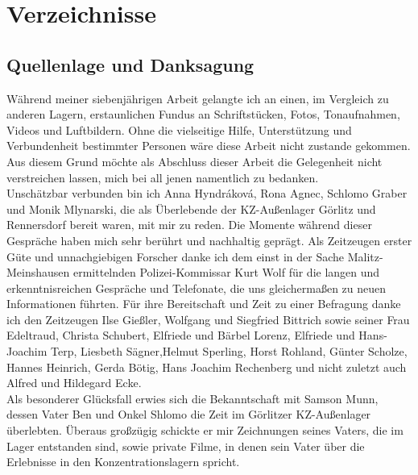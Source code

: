 \documentclass[a4paper,12pt,ngerman,
]{nisebook}
\begin{document}
\chapter{Verzeichnisse}


%
\section*{Quellenlage und Danksagung}
Während meiner siebenjährigen Arbeit gelangte ich an einen, im Vergleich zu anderen Lagern, erstaunlichen Fundus an Schriftstücken, Fotos, Tonaufnahmen, Videos und Luftbildern. Ohne die vielseitige Hilfe, Unterstützung und Verbundenheit bestimmter Personen wäre diese Arbeit nicht zustande gekommen. Aus diesem Grund möchte als Abschluss dieser Arbeit die Gelegenheit nicht verstreichen lassen, mich bei all jenen namentlich zu bedanken.
\\
Unschätzbar verbunden bin ich Anna Hyndr\'akov\'a, Rona Agnec, Schlomo Graber und Monik Mlynarski, die als Überlebende der KZ-Außenlager Görlitz und Rennersdorf bereit waren, mit mir zu reden. Die Momente während dieser Gespräche haben mich sehr berührt und nachhaltig geprägt. Als Zeitzeugen erster Güte und unnachgiebigen Forscher danke ich dem einst in der Sache Malitz-Meinshausen ermittelnden Polizei-Kommissar Kurt Wolf für die langen und erkenntnisreichen Gespräche und Telefonate, die uns gleichermaßen zu neuen Informationen führten.
Für ihre Bereitschaft und Zeit zu einer Befragung danke ich den Zeitzeugen Ilse Gießler, Wolfgang und Siegfried Bittrich sowie seiner Frau Edeltraud, Christa Schubert, Elfriede und Bärbel Lorenz, Elfriede und Hans-Joachim Terp, Liesbeth Sägner,Helmut Sperling, Horst Rohland, Günter Scholze, Hannes Heinrich, Gerda Bötig, Hans Joachim Rechenberg und nicht zuletzt auch Alfred und Hildegard Ecke.
\\
Als besonderer Glücksfall erwies sich die Bekanntschaft mit Samson Munn, dessen Vater Ben und Onkel Shlomo die Zeit im Görlitzer KZ-Außenlager überlebten. Überaus großzügig schickte er mir Zeichnungen seines Vaters, die im Lager entstanden sind, sowie private Filme, in denen sein Vater über die Erlebnisse in den Konzentrationslagern spricht.
\end{document}
